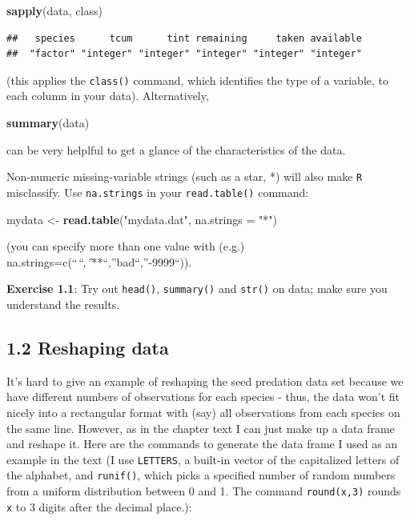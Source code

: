 \documentclass[11pt,]{article}
\newenvironment{Shaded}{\begin{snugshade}}{\end{snugshade}}
\newcommand{\KeywordTok}[1]{\textcolor[rgb]{0.13,0.29,0.53}{\textbf{#1}}}
\newcommand{\DataTypeTok}[1]{\textcolor[rgb]{0.13,0.29,0.53}{#1}}
\newcommand{\StringTok}[1]{\textcolor[rgb]{0.31,0.60,0.02}{#1}}
\newcommand{\NormalTok}[1]{#1}
\begin{document}
\begin{Shaded}
\begin{Highlighting}[]
\KeywordTok{sapply}\NormalTok{(data, class)}
\end{Highlighting}
\end{Shaded}

\begin{verbatim}
##   species      tcum      tint remaining     taken available 
##  "factor" "integer" "integer" "integer" "integer" "integer"
\end{verbatim}

(this applies the \texttt{class()} command, which identifies the type of
a variable, to each column in your data). Alternatively,

\begin{Shaded}
\begin{Highlighting}[]
\KeywordTok{summary}\NormalTok{(data)}
\end{Highlighting}
\end{Shaded}

can be very helplful to get a glance of the characteristics of the data.

Non-numeric missing-variable strings (such as a star, *) will also make
\texttt{R} misclassify. Use \texttt{na.strings} in your
\texttt{read.table()} command:

\begin{Shaded}
\begin{Highlighting}[]
\NormalTok{mydata <-}\StringTok{ }\KeywordTok{read.table}\NormalTok{(}\StringTok{"mydata.dat"}\NormalTok{, }\DataTypeTok{na.strings =} \StringTok{"*"}\NormalTok{)}
\end{Highlighting}
\end{Shaded}

(you can specify more than one value with (e.g.)
na.strings=c(``\emph{``,''}**``,''bad``,''-9999``)).

\textbf{Exercise 1.1}: Try out \texttt{head()}, \texttt{summary()} and
\texttt{str()} on data; make sure you understand the results.

\subsection{1.2 Reshaping data}\label{reshaping-data}

It's hard to give an example of reshaping the seed predation data set
because we have different numbers of observations for each species -
thus, the data won't fit nicely into a rectangular format with (say) all
observations from each species on the same line. However, as in the
chapter text I can just make up a data frame and reshape it. Here are
the commands to generate the data frame I used as an example in the text
(I use \texttt{LETTERS}, a built-in vector of the capitalized letters of
the alphabet, and \texttt{runif()}, which picks a specified number of
random numbers from a uniform distribution between 0 and 1. The command
\texttt{round(x,3)} rounds \texttt{x} to 3 digits after the decimal
place.):
\end{document}
